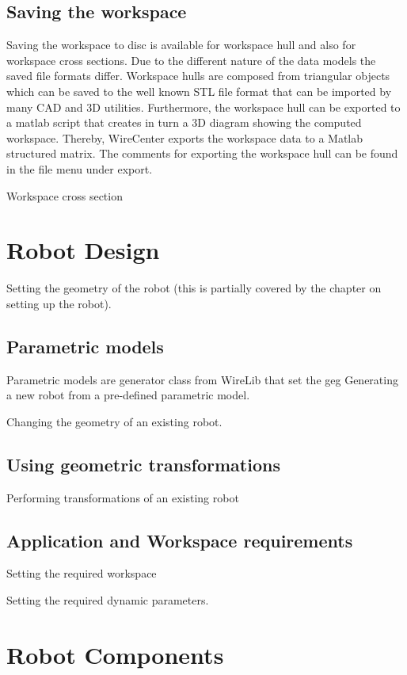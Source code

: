 \documentclass[11pt,a4paper,onepage,openany]{book}
\begin{document}
\section{Saving the workspace}
Saving the workspace to disc is available for workspace hull and also for
workspace cross sections. Due to the different nature of the data models the
saved file formats differ. Workspace hulls are composed from triangular
objects which can be saved to the well known STL file format that can be
imported by many CAD and 3D utilities. Furthermore, the workspace hull can
be exported to a matlab script that creates in turn a 3D diagram showing the
computed workspace. Thereby, WireCenter exports the workspace data to a
Matlab structured matrix. The comments for exporting the workspace hull can
be found in the file menu under export.

Workspace cross section

\chapter{Robot Design}\label{sec:RobotDesign}%
Setting the geometry of the robot (this is partially covered by the chapter
on
setting up the robot).


\section{Parametric models}
Parametric models are generator class from WireLib that set the geg
Generating a new robot from a pre-defined parametric model.

Changing the geometry of an existing robot.

\section{Using geometric transformations}
Performing transformations of an existing robot

\section{Application and Workspace requirements}
Setting the required workspace

Setting the required dynamic parameters.

\chapter{Robot Components}\label{sec:RobotComponents}%
\end{document}
